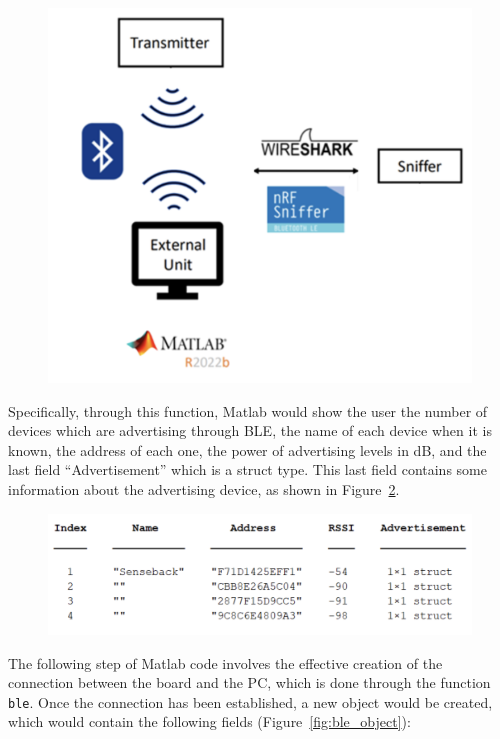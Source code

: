 \documentclass{Configuration_Files/PoliMi3i_thesis}
\begin{document}
\begin{figure}[H]
\centering
\includegraphics[scale=0.7]{Board_Windows_PC/1.png}
\label{fig:blelist}
\end{figure}

Specifically, through this function, Matlab would show the user the number of devices which are advertising through BLE, the name of each device when it is known, the address of each one, the power of advertising levels in dB, and the last field “Advertisement” which is a struct type. This last field contains some information about the advertising device, as shown in Figure~\ref{fig:advertisement}.

\begin{figure}[H]
\centering
\includegraphics[scale=0.7]{Board_Windows_PC/2.png}
\label{fig:advertisement}
\end{figure}

The following step of Matlab code involves the effective creation of the connection between the board and the PC, which is done through the function \texttt{ble}. Once the connection has been established, a new object would be created, which would contain the following fields (Figure~\ref{fig:ble_object}):
\end{document}
